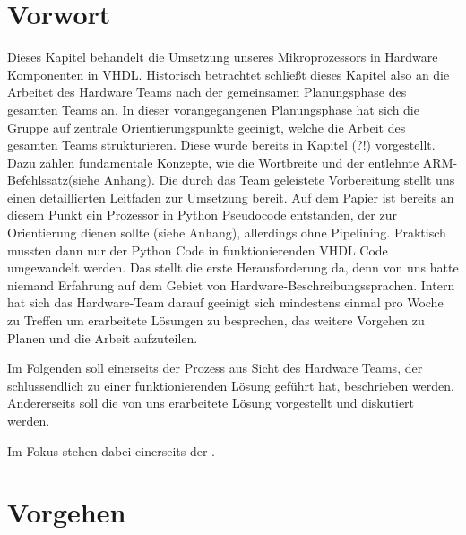 \documentclass[paper=a4,fontsize=12pt]{scrreprt}
\begin{document}
\section{Vorwort}

Dieses Kapitel behandelt die Umsetzung unseres Mikroprozessors in Hardware Komponenten in VHDL.
Historisch betrachtet schließt dieses Kapitel also an die Arbeitet des Hardware Teams nach der gemeinsamen Planungsphase des gesamten Teams an.
In dieser vorangegangenen Planungsphase hat sich die Gruppe auf zentrale Orientierungspunkte geeinigt, welche die Arbeit des gesamten Teams strukturieren. Diese wurde bereits in Kapitel (?!) vorgestellt. Dazu zählen fundamentale Konzepte, wie die Wortbreite und der entlehnte ARM-Befehlssatz(siehe Anhang).
Die durch das Team geleistete Vorbereitung stellt uns einen detaillierten Leitfaden zur Umsetzung bereit. Auf dem Papier ist bereits an diesem Punkt ein Prozessor in Python Pseudocode entstanden, der zur Orientierung dienen sollte (siehe Anhang), allerdings ohne Pipelining.
Praktisch mussten dann nur der Python Code in funktionierenden VHDL Code umgewandelt werden. Das stellt die erste Herausforderung da, denn von uns hatte niemand Erfahrung auf dem Gebiet von Hardware-Beschreibungssprachen. Intern hat sich das Hardware-Team darauf geeinigt sich mindestens einmal pro Woche zu Treffen um erarbeitete Lösungen zu besprechen, das weitere Vorgehen zu Planen und die Arbeit aufzuteilen.

Im Folgenden soll einerseits der Prozess aus Sicht des Hardware Teams, der schlussendlich zu einer funktionierenden Lösung geführt hat, beschrieben werden. Andererseits soll die von uns erarbeitete Lösung vorgestellt und diskutiert werden.

Im Fokus stehen dabei einerseits der .

\section{Vorgehen}
\end{document}
